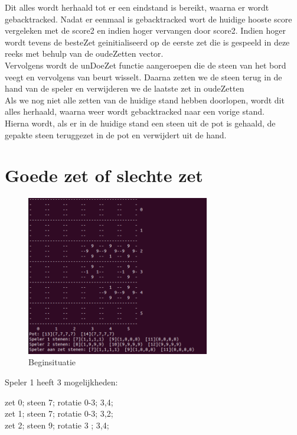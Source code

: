 \documentclass{article}
\begin{document}
Dit alles wordt herhaald tot er een eindstand is bereikt, waarna er wordt gebacktracked. Nadat er eenmaal is gebacktracked wort de huidige hooste score vergeleken met de score2 en indien hoger vervangen door score2. Indien hoger wordt tevens de besteZet geinitialiseerd op de eerste zet die is gespeeld in deze reeks met behulp van de oudeZetten vector.\\

Vervolgens wordt de unDoeZet functie aangeroepen die de steen van het bord veegt en vervolgens van beurt wisselt. Daarna zetten we de steen terug in de hand van de speler en verwijderen we de laatste zet in oudeZetten\\

Als we nog niet alle zetten van de huidige stand hebben doorlopen, wordt dit alles herhaald, waarna weer wordt gebacktracked naar een vorige stand.\\

Hierna wordt, als er in de huidige stand een steen uit de pot is gehaald, de gepakte steen teruggezet in de pot en verwijdert uit de hand.

\section{Goede zet of slechte zet}

\begin{figure}[htp]
    \centering
    \includegraphics[width=8cm]{algo1/imgs/one.png}
    \caption{Beginsituatie}
    \label{fig:galaxy}
\end{figure}
Speler 1 heeft 3 mogelijkheden:

zet 0; steen 7; rotatie 0-3; 3,4;\\

zet 1; steen 7; rotatie 0-3; 3,2;\\

zet 2; steen 9; rotatie 3  ; 3,4;\\
\end{document}
